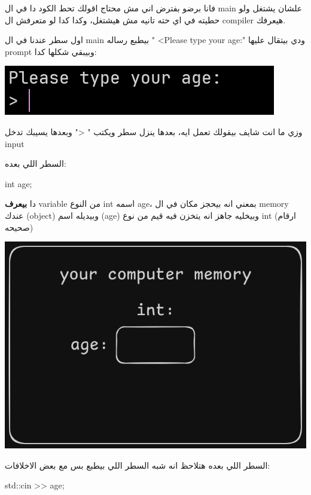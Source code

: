 \documentclass[11pt]{article}
\let\OriginalVerbatim\verbatim
\let\endOriginalVerbatim\endverbatim
\renewenvironment{verbatim}{\begin{english}\OriginalVerbatim}{\endOriginalVerbatim\end{english}}
\begin{document}
فانا برضو بفترض اني مش محتاج اقولك تحط الكود دا في ال main علشان يشتغل ولو حطيته في اي حته تانيه مش هيشتغل، وكدا كدا لو متعرفش ال compiler هيعرفك.

اول سطر عندنا في ال main بيطبع رساله " <Please type your age:\n" ودي بيتقال عليها prompt وبيبقي شكلها كدا:

\begin{center}
\includegraphics[width=.9\linewidth]{../images/prompt.png}
\end{center}

وزي ما انت شايف بيقولك تعمل ايه، بعدها ينزل سطر ويكتب " <" وبعدها يسيبك تدخل input

السطر اللي بعده:

\begin{verbatim}
int age;
\end{verbatim}

دا \textbf{بيعرف} variable من النوع int اسمه age، بمعني انه بيحجز مكان في ال memory عندك (object) وبيديله اسم (age) وبيخليه جاهز انه يتخزن فيه قيم من نوع int (ارقام صحيحه)

\begin{center}
\includegraphics[width=.9\linewidth]{../images/empty_int_variable.png}
\end{center}

السطر اللي بعده هتلاحظ انه شبه السطر اللي بيطبع بس مع بعض الاخلافات:

\begin{verbatim}
std::cin >> age;
\end{verbatim}
\end{document}

